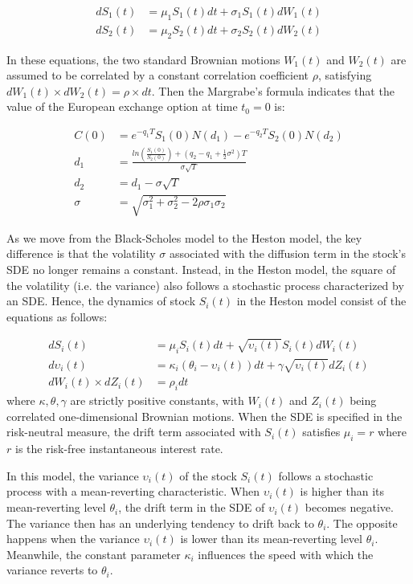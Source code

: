 \documentclass{article}
\begin{document}
	\begin{align}
	dS_1(t) &= \mu_1 S_1(t) dt + \sigma_1 S_1(t) dW_1(t) \\
	dS_2(t) &= \mu_2 S_2(t) dt + \sigma_2 S_2(t) dW_2(t)
	\end{align}	
	
	In these equations, the two standard Brownian motions $W_1(t)$ and $W_2(t)$ are assumed to be correlated by a constant correlation coefficient $\rho$, satisfying $dW_1(t) \times dW_2(t) = \rho \times dt$. Then the Margrabe's formula indicates that the value of the European exchange option at time $t_0=0$ is:
	
	\begin{align}
	C(0) &= e^{-q_1 T} S_1(0) N(d_1) - e^{-q_2 T} S_2(0) N(d_2) \\
	d_1 &= \frac{ln(\frac{S_1(0)}{S_2(0)}) + (q_2 - q_1 + \frac{1}{2} \sigma^2) T}{\sigma \sqrt{T}} \\
	d_2 &= d_1 - \sigma \sqrt{T} \\
	\sigma &= \sqrt{\sigma_1^2 + \sigma_2^2 - 2 \rho \sigma_1 \sigma_2}
	\end{align}	
	
	As we move from the Black-Scholes model to the Heston model, the key difference is that the volatility $\sigma$ associated with the diffusion term in the stock's SDE no longer remains a constant. Instead, in the Heston model, the square of the volatility (i.e. the variance) also follows a stochastic process characterized by an SDE. Hence, the dynamics of stock $S_i(t)$ in the Heston model consist of the equations as follows:
	
	\begin{align}
	dS_i(t) &= \mu_i S_i(t) dt + \sqrt{\upsilon_i(t)} S_i(t) dW_i(t) \\
	d\upsilon_i(t) &= \kappa_i (\theta_i - \upsilon_i(t)) dt + \gamma \sqrt{\upsilon_i(t)} dZ_i(t) \\
	dW_i(t) \times dZ_i(t) &= \rho_i dt
	\end{align}
	where $\kappa, \theta, \gamma$ are strictly positive constants, with $W_i(t)$ and $Z_i(t)$ being correlated one-dimensional Brownian motions. When the SDE is specified in the risk-neutral measure, the drift term associated with $S_i(t)$ satisfies $\mu_i = r$ where $r$ is the risk-free instantaneous interest rate.
			
	In this model, the variance $\upsilon_i(t)$ of the stock $S_i(t)$ follows a stochastic process with a mean-reverting characteristic. When $\upsilon_i(t)$ is higher than its mean-reverting level $\theta_i$, the drift term in the SDE of $\upsilon_i(t)$ becomes negative. The variance then has an underlying tendency to drift back to $\theta_i$. The opposite happens when the variance $\upsilon_i(t)$ is lower than its mean-reverting level $\theta_i$. Meanwhile, the constant parameter $\kappa_i$ influences the speed with which the variance reverts to $\theta_i$. 
	
\end{document}
